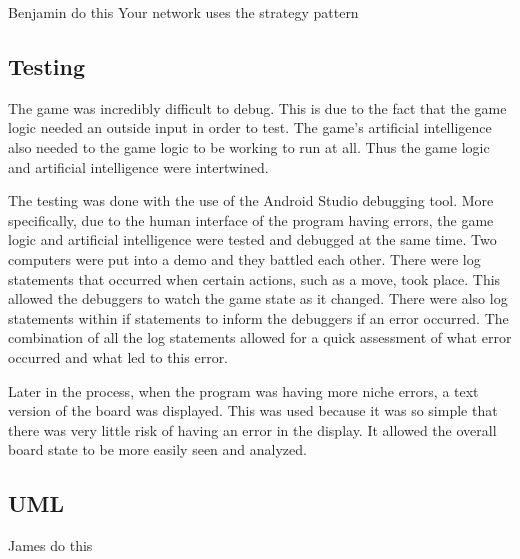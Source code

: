 \documentclass{article}
\begin{document}
Benjamin do this
Your network uses the strategy pattern

\subsection{Testing}
	The game was incredibly difficult to debug. This is due to the fact that the game logic needed an outside input in order to test. The game's artificial intelligence also needed to the game logic to be working to run at all. Thus the game logic and artificial intelligence were intertwined. \par
	The testing was done with the use of the Android Studio debugging tool. More specifically, due to the human interface of the program having errors, the game logic and artificial intelligence were tested and debugged at the same time. Two computers were put into a demo and they battled each other. There were log statements that occurred when certain actions, such as a move, took place. This allowed the debuggers to watch the game state as it changed. There were also log statements within if statements to inform the debuggers if an error occurred. The combination of all the log statements allowed for a quick assessment of what error occurred and what led to this error. \par
	Later in the process, when the program was having more niche errors, a text version of the board was displayed. This was used because it was so simple that there was very little risk of having an error in the display. It allowed the overall board state to be more easily seen and analyzed.

\subsection{UML}
James do this
\end{document}
